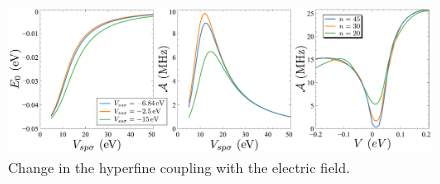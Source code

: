 %
%
%
%
%
%

\begin{figure}[h!]
\centering
\includegraphics{artlat/fig/hyperfine.pdf}
\vspace{-20pt}
\caption{Change in the hyperfine coupling with the electric field.}
\label{latt_hyper}
\end{figure}
\FloatBarrier
